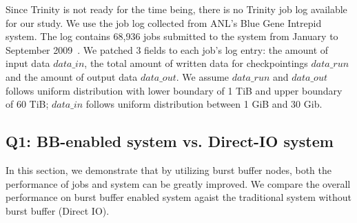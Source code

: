 Since Trinity is not ready for the time being, there is no Trinity job log available for our study.
We use the job log collected from ANL's Blue Gene Intrepid system. The log contains 68,936 jobs
submitted to the system from January to September 2009~\cite{JobTrace}.
We patched 3 fields to each job's log entry: the amount of input data $data\_in$,
the total amount of written data for checkpointings $data\_run$
and the amount of output data $data\_out$.
We assume $data\_run$ and $data\_out$ follows uniform distribution with
lower boundary of 1 TiB and upper boundary of 60 TiB;
$data\_in$ follows uniform distribution between 1 GiB and 30 Gib.



\subsection{Q1: BB-enabled system vs. Direct-IO system}
\label{Sec:Sim:DirectIOvsBB}


In this section, we demonstrate that by utilizing burst buffer nodes,
both the performance of jobs and system can be greatly improved. 
We compare the overall performance on burst buffer enabled system
agaist the traditional system without burst buffer (Direct IO).



